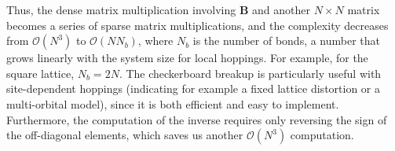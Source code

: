 Thus, the dense matrix multiplication involving $\bm B$ and another $N \times N$ matrix becomes a series of sparse matrix multiplications, and the complexity decreases from $\mathcal{O}(N^3)$ to $\mathcal{O}(N N_b)$, where $N_b$ is the number of bonds, a number that grows linearly with the system size for local hoppings.
For example, for the square lattice, $N_b = 2 N$.
The checkerboard breakup is particularly useful with site-dependent hoppings (indicating for example a fixed lattice distortion or a multi-orbital model), since it is both efficient and easy to implement.
Furthermore, the computation of the inverse requires only reversing the sign of the off-diagonal elements, which saves us another $\mathcal{O}(N^3)$ computation.
